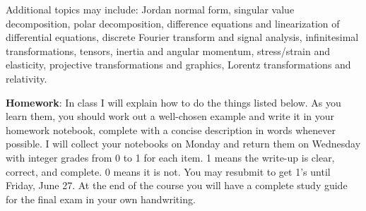 \documentclass[10pt]{article}
\begin{document}
Additional topics may include: Jordan normal form, singular value decomposition, polar decomposition, difference equations and linearization of differential equations, discrete Fourier transform and signal analysis, infinitesimal transformations, tensors, inertia and angular momentum, stress/strain and elasticity, projective transformations and graphics, Lorentz transformations and relativity.

\vspace{1pc}

\textbf{Homework}: In class I will explain how to do the things listed below.  As you learn them, you should work out a well-chosen example and write it in your homework notebook, complete with a concise description in words whenever possible.  I will collect your notebooks on Monday and return them on Wednesday with integer grades from 0 to 1 for each item.  1 means the write-up is clear, correct, and complete.  0 means it is not.  You may resubmit to get 1's until Friday, June 27.  At the end of the course you will have a complete study guide for the final exam in your own handwriting.

\pagebreak
\end{document}
